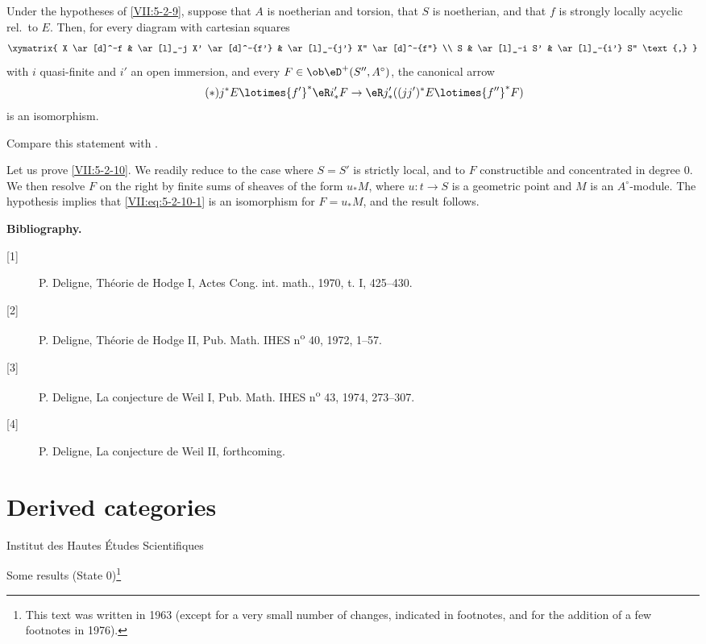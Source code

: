 \begin{proposition}\label{VII:5-2-10}
Under the hypotheses of \ref{VII:5-2-9}, suppose that $A$ is noetherian and
torsion, that $S$ is noetherian, and that $f$ is strongly locally acyclic
rel.\ to $E$. Then, for every diagram with cartesian squares
\[\xymatrix{
  X \ar[d]^-f 
    & \ar[l]_-j X' \ar[d]^-{f'} 
    & \ar[l]_-{j'} X'' \ar[d]^-{f''} \\
  S 
    & \ar[l]_-i S' 
    & \ar[l]_-{i'} S'' \text{,} 
}\]
with $i$ quasi-finite and $i'$ an open immersion, and every
$F\in\ob\eD^+(S'',A^\circ)$, the canonical arrow
\begin{equation*}\tag{$*$}\label{VII:eq:5-2-10-1}
  j^\ast E \lotimes {f'}^\ast \eR i'_\ast F \to \eR j'_\ast ((j j')^\ast E\lotimes {f''}^\ast F) 
\end{equation*}
is an isomorphism.
\end{proposition}

Compare this statement with .

Let us prove \ref{VII:5-2-10}. We readily reduce to the case where $S=S'$ is
strictly local, and to $F$ constructible and concentrated in degree $0$. We then
resolve $F$ on the right by finite sums of sheaves of the form $u_\ast M$,
where $u:t\to S$ is a geometric point and $M$ is an $A^\circ$-module. The
hypothesis implies that
\eqref{VII:eq:5-2-10-1} is an isomorphism for $F=u_\ast M$, and the result
follows.


\begin{center}\textbf{Bibliography.}\end{center}
\begin{description}
\item[{[1]}] P. Deligne, Théorie de Hodge I, Actes Cong. int. math., 1970, t. I, 425--430.
\item[{[2]}] P. Deligne, Théorie de Hodge II, Pub. Math. IHES n\textsuperscript{o} 40, 1972, 1--57.
\item[{[3]}] P. Deligne, La conjecture de Weil I, Pub. Math. IHES n\textsuperscript{o} 43, 1974, 273--307.
\item[{[4]}] P. Deligne, La conjecture de Weil II, forthcoming.
\end{description}


\chapter{Derived categories}\label{VIII}
\begin{center}Institut des Hautes Études Scientifiques\end{center}
Some results (State 0)\footnote{This text was written in 1963 (except for a very small number of changes, indicated in footnotes, and for the addition of a few footnotes in 1976).}

